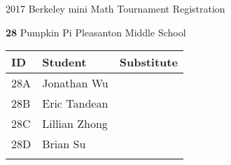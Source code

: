 \documentclass[12pt]{amsart}
\begin{document}
\newpage



\renewcommand{\TeamID}{28}
\renewcommand{\TeamName}{Pumpkin Pi}
\renewcommand{\SchoolName}{Pleasanton Middle School}
\renewcommand{\IDA}{28A}
\renewcommand{\IDB}{28B}
\renewcommand{\IDC}{28C}
\renewcommand{\IDD}{28D}
\renewcommand{\IDE}{}
\renewcommand{\StudentA}{Jonathan Wu}
\renewcommand{\StudentB}{Eric Tandean}
\renewcommand{\StudentC}{Lillian Zhong}
\renewcommand{\StudentD}{Brian Su}
\renewcommand{\StudentE}{}

\begin{center}
{\sc \Large 2017 Berkeley mini Math Tournament Registration}

\bigskip
\bigskip

{\bf \Large  \TeamID} \hfill {\large \TeamName} \hfill {\large \SchoolName}

\bigskip
\bigskip

\begin{tabular}{| p{} | p{} | p{} |}
\hline
\bf ID         & \bf Student             & \bf Substitute             \\ \hline
\IDA           & \StudentA               &                            \\ \hline
\IDB           & \StudentB               &                            \\ \hline
\IDC           & \StudentC               &                            \\ \hline
\IDD           & \StudentD               &                            \\ \hline
\IDE           & \StudentE               &                            \\ \hline
\end{tabular} 
\end{center}
\bigskip
\bigskip

\newpage



\renewcommand{\TeamID}{29}
\renewcommand{\TeamName}{Random Math - Team Black}
\renewcommand{\SchoolName}{Random Math}
\renewcommand{\IDA}{29A}
\renewcommand{\IDB}{29B}
\renewcommand{\IDC}{29C}
\renewcommand{\IDD}{29D}
\renewcommand{\IDE}{29E}
\renewcommand{\StudentA}{Shivatmica Murgai}
\renewcommand{\StudentB}{Jeevith Chanveer}
\renewcommand{\StudentC}{Anushka Rala}
\renewcommand{\StudentD}{Abhitrika Rala}
\renewcommand{\StudentE}{Rishita Shah}
\end{document}
